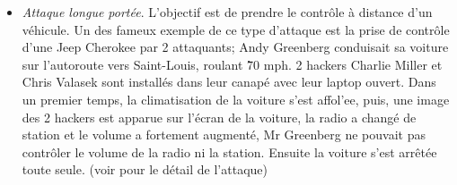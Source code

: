 \begin{itemize}
\item \emph{Attaque longue port\'ee}. L'objectif est de prendre le contr\^ole \`a distance d'un v\'ehicule. Un des fameux exemple de ce type d'attaque est la prise de contr\^ole d'une Jeep Cherokee par 2 attaquants; Andy Greenberg conduisait sa voiture sur l'autoroute vers Saint-Louis, roulant \` 70 mph. 2 hackers Charlie Miller et Chris Valasek sont install\'es dans leur canap\'e avec leur laptop ouvert. Dans un premier temps, la climatisation de la voiture s'est affol'ee, puis, une image des 2 hackers est apparue sur l'\'ecran de la voiture, la radio a chang\'e de station et le volume a fortement augment\'e, Mr Greenberg ne pouvait pas contr\^oler le volume de la radio ni la station. Ensuite la voiture s'est arr\^et\'ee toute seule. (voir \cite{Mil2015} pour le d\'etail de l'attaque)
\end{itemize}


